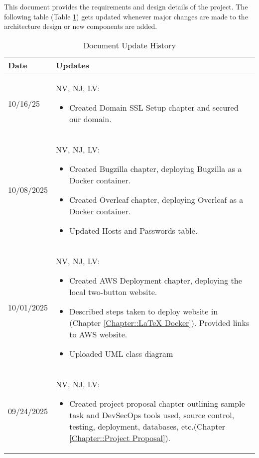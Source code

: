 This document provides the requirements and design details of the
project.  The following table (Table \ref{Table::UpdateHistory}) gets
updated whenever major changes are made to the architecture
design or new components are added.

\begin{longtable}{|l||p{13.5cm}|}
\caption{Document Update History \label{Table::UpdateHistory}}\\
\hline
\textbf{Date} & \textbf{Updates} \\
\hline 
\endhead

10/16/25 & NV, NJ, LV:
\begin{itemize}[topsep=0pt, itemsep=0pt, parsep=0pt, partopsep=0pt, leftmargin=12pt]
    \item Created Domain SSL Setup chapter and secured our domain.
\end{itemize}
\\ \hline

10/08/2025 & NV, NJ, LV:
\begin{itemize}[topsep=0pt, itemsep=0pt, parsep=0pt, partopsep=0pt, leftmargin=12pt]
    \item Created Bugzilla chapter, deploying Bugzilla as a Docker container.
    \item Created Overleaf chapter, deploying Overleaf as a Docker container.
    \item Updated Hosts and Passwords table.
\end{itemize}
\\ \hline

10/01/2025 & NV, NJ, LV:
\begin{itemize}[topsep=0pt,itemsep=0pt,parsep=0pt,partopsep=0pt,leftmargin=12pt]
    \item Created AWS Deployment chapter, deploying the local two-button website.
    \item Described steps taken to deploy website in (Chapter \ref{Chapter::LaTeX Docker}). Provided links to AWS website.
    \item Uploaded UML class diagram
\end{itemize}
\\ \hline

09/24/2025 & NV, NJ, LV:
\begin{itemize}[topsep=0pt,itemsep=0pt,parsep=0pt,partopsep=0pt,leftmargin=12pt]
\item Created project proposal chapter outlining sample task and DevSecOps tools used, source control, testing, deployment, databases, etc.(Chapter \ref{Chapter::Project Proposal}).
\end{itemize} 
\\ \hline


\end{longtable}
